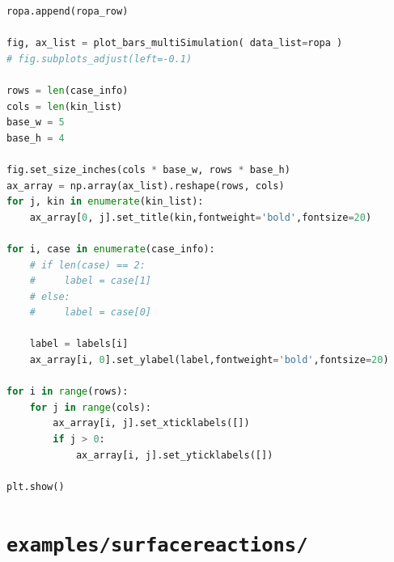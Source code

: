 \documentclass[11pt,a4paper]{report}
\begin{document}
\begin{lstlisting}[language=Python]
    ropa.append(ropa_row)

fig, ax_list = plot_bars_multiSimulation( data_list=ropa )
# fig.subplots_adjust(left=-0.1)

rows = len(case_info)
cols = len(kin_list)
base_w = 5
base_h = 4

fig.set_size_inches(cols * base_w, rows * base_h)
ax_array = np.array(ax_list).reshape(rows, cols)
for j, kin in enumerate(kin_list):
    ax_array[0, j].set_title(kin,fontweight='bold',fontsize=20)

for i, case in enumerate(case_info):
    # if len(case) == 2:
    #     label = case[1]
    # else:
    #     label = case[0]

    label = labels[i]
    ax_array[i, 0].set_ylabel(label,fontweight='bold',fontsize=20)

for i in range(rows):
    for j in range(cols):
        ax_array[i, j].set_xticklabels([])
        if j > 0:
            ax_array[i, j].set_yticklabels([])

plt.show()
\end{lstlisting}

\section{\texttt{examples/surfacereactions/}}
\end{document}
